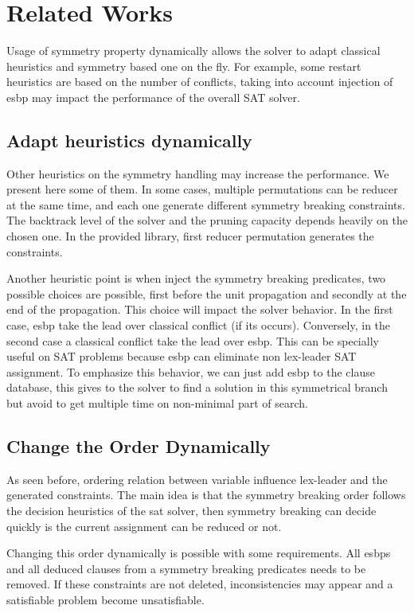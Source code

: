 \section{Related Works}
Usage of symmetry property dynamically allows the solver to adapt classical heuristics and symmetry based one on the fly.
For example, some restart heuristics are based on the number of conflicts, taking into account injection of esbp may impact
the performance of the overall SAT solver. 

\subsection{Adapt heuristics dynamically}
Other heuristics on the symmetry handling may increase the performance. We present here some of them.
In some cases, multiple permutations can be reducer at the same time, and each one generate different symmetry breaking constraints.
The backtrack level of the solver and the pruning capacity depends heavily on the chosen one. In the provided library, first reducer permutation generates the constraints. 

Another heuristic point is when inject the symmetry breaking predicates, two possible choices are possible, first
before the unit propagation and secondly at the end of the propagation. This choice will impact the solver behavior.
In the first case, esbp take the lead over  classical conflict (if its occurs). Conversely, in the second case a classical conflict
take the lead over esbp. This can be specially useful on SAT problems because esbp can eliminate non lex-leader SAT assignment.
To emphasize this behavior, we can just add esbp to the clause database, this gives to the solver to find a solution in this 
symmetrical branch but avoid to get multiple time on non-minimal part of search. 



\subsection{Change the Order Dynamically}
As seen before, ordering relation between variable influence lex-leader and the generated constraints. 
The main idea is that the symmetry breaking order follows the decision heuristics of the sat solver, then symmetry breaking
can decide quickly is the current assignment can be reduced or not.

Changing this order dynamically is possible with some requirements. All esbps  and all deduced 
clauses from a symmetry breaking predicates needs to be removed. If these constraints are not deleted, inconsistencies 
may appear and a satisfiable problem become unsatisfiable. 



